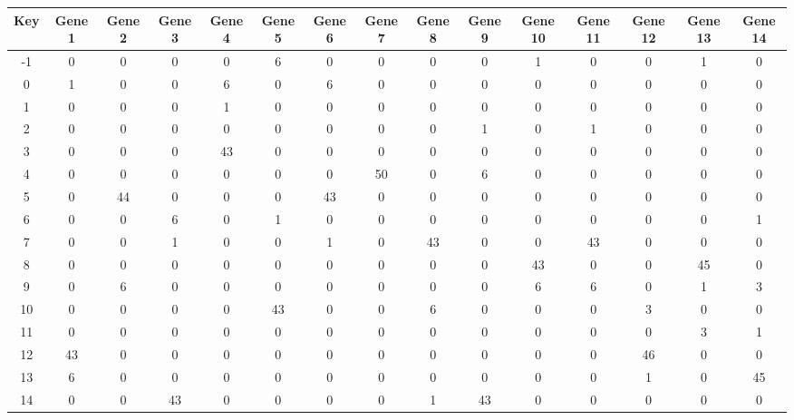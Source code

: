 \begin{tabular}{|c|c|c|c|c|c|c|c|c|c|c|c|c|c|c|}
\hline
Key & Gene 1 & Gene 2 & Gene 3 & Gene 4 & Gene 5 & Gene 6 & Gene 7 & Gene 8 & Gene 9 & Gene 10 & Gene 11 & Gene 12 & Gene 13 & Gene 14 \\
\hline
-1 & 0 & 0 & 0 & 0 & 6 & 0 & 0 & 0 & 0 & 1 & 0 & 0 & 1 & 0 \\
0 & 1 & 0 & 0 & 6 & 0 & 6 & 0 & 0 & 0 & 0 & 0 & 0 & 0 & 0 \\
1 & 0 & 0 & 0 & 1 & 0 & 0 & 0 & 0 & 0 & 0 & 0 & 0 & 0 & 0 \\
2 & 0 & 0 & 0 & 0 & 0 & 0 & 0 & 0 & 1 & 0 & 1 & 0 & 0 & 0 \\
3 & 0 & 0 & 0 & 43 & 0 & 0 & 0 & 0 & 0 & 0 & 0 & 0 & 0 & 0 \\
4 & 0 & 0 & 0 & 0 & 0 & 0 & 50 & 0 & 6 & 0 & 0 & 0 & 0 & 0 \\
5 & 0 & 44 & 0 & 0 & 0 & 43 & 0 & 0 & 0 & 0 & 0 & 0 & 0 & 0 \\
6 & 0 & 0 & 6 & 0 & 1 & 0 & 0 & 0 & 0 & 0 & 0 & 0 & 0 & 1 \\
7 & 0 & 0 & 1 & 0 & 0 & 1 & 0 & 43 & 0 & 0 & 43 & 0 & 0 & 0 \\
8 & 0 & 0 & 0 & 0 & 0 & 0 & 0 & 0 & 0 & 43 & 0 & 0 & 45 & 0 \\
9 & 0 & 6 & 0 & 0 & 0 & 0 & 0 & 0 & 0 & 6 & 6 & 0 & 1 & 3 \\
10 & 0 & 0 & 0 & 0 & 43 & 0 & 0 & 6 & 0 & 0 & 0 & 3 & 0 & 0 \\
11 & 0 & 0 & 0 & 0 & 0 & 0 & 0 & 0 & 0 & 0 & 0 & 0 & 3 & 1 \\
12 & 43 & 0 & 0 & 0 & 0 & 0 & 0 & 0 & 0 & 0 & 0 & 46 & 0 & 0 \\
13 & 6 & 0 & 0 & 0 & 0 & 0 & 0 & 0 & 0 & 0 & 0 & 1 & 0 & 45 \\
14 & 0 & 0 & 43 & 0 & 0 & 0 & 0 & 1 & 43 & 0 & 0 & 0 & 0 & 0 \\
\hline
\end{tabular}